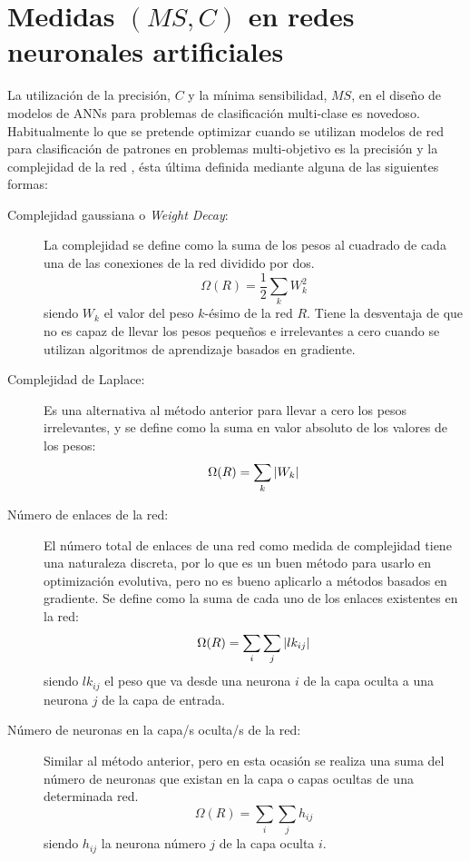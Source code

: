 \section{Medidas $(MS,C)$ en redes neuronales artificiales}\label{objetivosRedes}
\noindent La utilización de la precisión, $C$ y la mínima sensibilidad, $MS$, en el
diseño de modelos de ANNs para problemas de clasificación multi-clase es novedoso.
Habitualmente lo que se pretende optimizar cuando se utilizan modelos de red para
clasificación de patrones en problemas multi-objetivo es la precisión y la complejidad de
la red \cite{Goh2008,Dehuri2009,Jin2005}, ésta última definida mediante alguna de las
siguientes formas:
\begin{description}
\item[Complejidad gaussiana o \textit{Weight Decay}:] La complejidad se define como la
suma de los pesos al cuadrado de cada una de las conexiones de la red dividido por dos.
\begin{displaymath}
\Omega(R)=\frac{1}{2}\sum_{k} W_{k}^2
\end{displaymath}
siendo $W_{k}$ el valor del peso $k$-ésimo de la red $R$. Tiene la desventaja de que no
es
capaz de llevar los pesos pequeños e irrelevantes a cero cuando se utilizan algoritmos
de	aprendizaje basados en gradiente.
\item[Complejidad de Laplace:] Es una alternativa al método anterior para llevar a
cero los pesos irrelevantes, y se define como la suma en valor absoluto de los valores de
los pesos:
\begin{displaymath}
\Omega(R)=\sum_{k} \arrowvert W_{k}\arrowvert
\end{displaymath}
\item[Número de enlaces de la red:] El número total de enlaces de una red como medida
de complejidad tiene una naturaleza discreta, por lo que es un buen
método para usarlo en optimización evolutiva, pero no es bueno aplicarlo a métodos
basados en gradiente. Se define como la suma de cada uno de los enlaces existentes en
la red:
\begin{displaymath}
\Omega(R)=\sum_{i}\sum_{j} \arrowvert lk_{ij}\arrowvert
\end{displaymath}
siendo $lk_{ij}$ el peso que va desde una neurona $i$ de la capa oculta a una neurona $j$
de la capa de entrada.
\item[Número de neuronas en la capa/s oculta/s de la red:] Similar al método anterior,
pero en esta ocasión se realiza una suma del número de neuronas que existan en la capa
o capas ocultas de una determinada red.
\begin{displaymath}
\Omega(R)=\sum_{i}\sum_{j}h_{ij}
\end{displaymath}
siendo $h_{ij}$ la neurona número $j$ de la capa oculta $i$.
\end{description}

